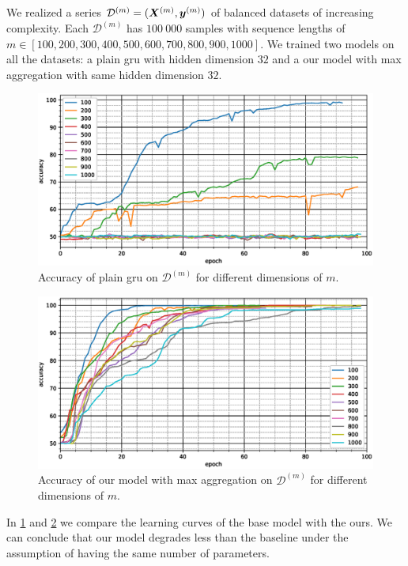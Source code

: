 We realized a series
$\mathcal{D}^{(m)}=(\bm{X}^{(m)},\bm{y}^{(m)})$ of balanced
datasets of increasing complexity. Each $\mathcal{D}^{(m)}$ has $100\ 000$
samples with 
sequence lengths of $m\in
[100,200,300,400,500,600,700,800,900,1000]$. We trained two models on
all the datasets: a plain \ac{gru} with hidden dimension $32$ and a
our model with max aggregation with same hidden dimension $32$. 

\begin{figure}
  \centering
  \includegraphics[width=\floatwidth]{imgMax/accuracy-base.eps}
  \caption{Accuracy of plain \ac{gru} on $\mathcal{D}^{(m)}$ for different dimensions of $m$.}
  \label{fig:testAccBase}
\end{figure}

\begin{figure}
  \centering
  \includegraphics[width=\floatwidth]{imgMax/accuracy-max.eps}
  \caption{Accuracy of our model with max aggregation on $\mathcal{D}^{(m)}$ for different dimensions of $m$.}
  \label{fig:testAccMax}
\end{figure}

In \cref{fig:testAccBase} and \cref{fig:testAccMax} we compare
the learning curves of the base model with the ours. We can conclude
that our model degrades less than the baseline under the assumption of
having the same number of parameters.

